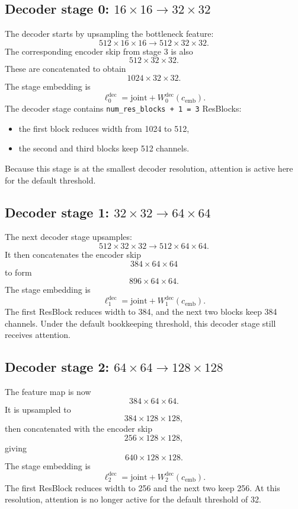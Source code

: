 \documentclass[11pt]{article}
\begin{document}
\subsection{Decoder stage 0: $16 \times 16 \to 32 \times 32$}
The decoder starts by upsampling the bottleneck feature:
\[
512 \times 16 \times 16 \to 512 \times 32 \times 32.
\]
The corresponding encoder skip from stage 3 is also
\[
512 \times 32 \times 32.
\]
These are concatenated to obtain
\[
1024 \times 32 \times 32.
\]
The stage embedding is
\[
\ell^{\mathrm{dec}}_0 = \mathrm{joint} + W^{\mathrm{dec}}_0(c_{\mathrm{emb}}).
\]
The decoder stage contains \texttt{num\_res\_blocks + 1 = 3} ResBlocks:
\begin{itemize}
  \item the first block reduces width from 1024 to 512,
  \item the second and third blocks keep 512 channels.
\end{itemize}
Because this stage is at the smallest decoder resolution, attention is active here for the default threshold.

\subsection{Decoder stage 1: $32 \times 32 \to 64 \times 64$}
The next decoder stage upsamples:
\[
512 \times 32 \times 32 \to 512 \times 64 \times 64.
\]
It then concatenates the encoder skip
\[
384 \times 64 \times 64
\]
to form
\[
896 \times 64 \times 64.
\]
The stage embedding is
\[
\ell^{\mathrm{dec}}_1 = \mathrm{joint} + W^{\mathrm{dec}}_1(c_{\mathrm{emb}}).
\]
The first ResBlock reduces width to 384, and the next two blocks keep 384 channels.
Under the default bookkeeping threshold, this decoder stage still receives attention.

\subsection{Decoder stage 2: $64 \times 64 \to 128 \times 128$}
The feature map is now
\[
384 \times 64 \times 64.
\]
It is upsampled to
\[
384 \times 128 \times 128,
\]
then concatenated with the encoder skip
\[
256 \times 128 \times 128,
\]
giving
\[
640 \times 128 \times 128.
\]
The stage embedding is
\[
\ell^{\mathrm{dec}}_2 = \mathrm{joint} + W^{\mathrm{dec}}_2(c_{\mathrm{emb}}).
\]
The first ResBlock reduces width to 256 and the next two keep 256.
At this resolution, attention is no longer active for the default threshold of 32.
\end{document}
